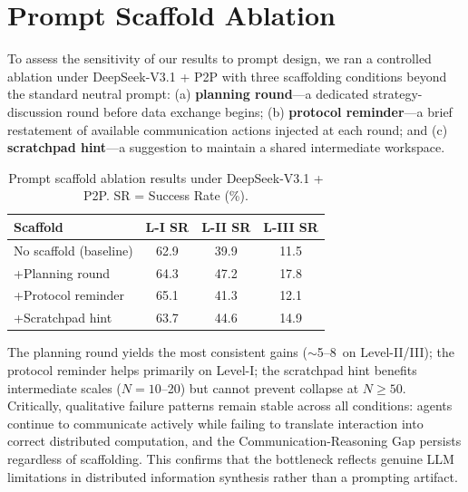 \section{Prompt Scaffold Ablation}
\label{app:scaffold_ablation}

To assess the sensitivity of our results to prompt design, we ran a controlled ablation under DeepSeek-V3.1 + P2P with three scaffolding conditions beyond the standard neutral prompt: (a) \textbf{planning round}---a dedicated strategy-discussion round before data exchange begins; (b) \textbf{protocol reminder}---a brief restatement of available communication actions injected at each round; and (c) \textbf{scratchpad hint}---a suggestion to maintain a shared intermediate workspace.

\begin{table}[h]
\centering
\small
\renewcommand{\arraystretch}{1.1}
\begin{tabular}{l ccc}
\toprule
\textbf{Scaffold} & \textbf{L-I SR} & \textbf{L-II SR} & \textbf{L-III SR} \\
\midrule
No scaffold (baseline) & 62.9 & 39.9 & 11.5 \\
+Planning round        & 64.3 & 47.2 & 17.8 \\
+Protocol reminder     & 65.1 & 41.3 & 12.1 \\
+Scratchpad hint       & 63.7 & 44.6 & 14.9 \\
\bottomrule
\end{tabular}
\caption{Prompt scaffold ablation results under DeepSeek-V3.1 + P2P. SR = Success Rate (\%).}
\label{tab:scaffold_ablation}
\end{table}

The planning round yields the most consistent gains ($\sim$5--8\ on Level-II/III); the protocol reminder helps primarily on Level-I; the scratchpad hint benefits intermediate scales ($N{=}10$--20) but cannot prevent collapse at $N{\geq}50$. Critically, qualitative failure patterns remain stable across all conditions: agents continue to communicate actively while failing to translate interaction into correct distributed computation, and the Communication-Reasoning Gap persists regardless of scaffolding. This confirms that the bottleneck reflects genuine LLM limitations in distributed information synthesis rather than a prompting artifact.